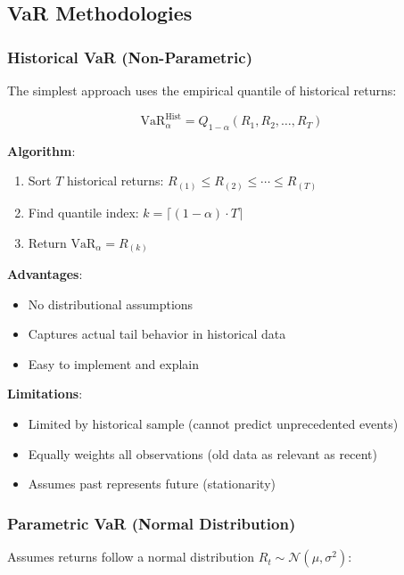 \documentclass[12pt,a4paper]{article}
\begin{document}
\subsection{VaR Methodologies}

\subsubsection{Historical VaR (Non-Parametric)}

The simplest approach uses the empirical quantile of historical returns:

\begin{equation}
\text{VaR}_\alpha^{\text{Hist}} = Q_{1-\alpha}(R_1, R_2, \ldots, R_T)
\end{equation}

\textbf{Algorithm}:
\begin{enumerate}
    \item Sort $T$ historical returns: $R_{(1)} \leq R_{(2)} \leq \cdots \leq R_{(T)}$
    \item Find quantile index: $k = \lceil (1-\alpha) \cdot T \rceil$
    \item Return $\text{VaR}_\alpha = R_{(k)}$
\end{enumerate}

\textbf{Advantages}:
\begin{itemize}
    \item No distributional assumptions
    \item Captures actual tail behavior in historical data
    \item Easy to implement and explain
\end{itemize}

\textbf{Limitations}:
\begin{itemize}
    \item Limited by historical sample (cannot predict unprecedented events)
    \item Equally weights all observations (old data as relevant as recent)
    \item Assumes past represents future (stationarity)
\end{itemize}

\subsubsection{Parametric VaR (Normal Distribution)}

Assumes returns follow a normal distribution $R_t \sim \mathcal{N}(\mu, \sigma^2)$:
\end{document}
